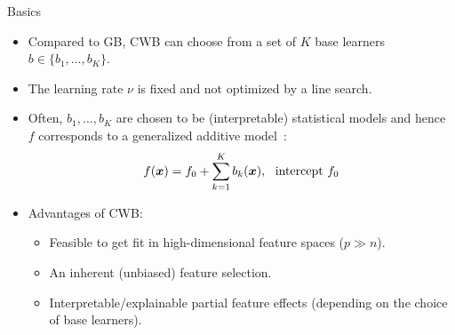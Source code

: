 \documentclass[t,10pt]{beamer}
\begin{document}
\begin{frame}{Basics}
  \begin{itemize}
    \item
      Compared to GB, CWB can choose from a set of $K$ base learners $b \in \{b_1, \dots, b_K\}$.

    \item
      The learning rate $\nu$ is fixed and not optimized by a line search.

    \item
      Often, $b_1, \dots, b_K$ are chosen to be (interpretable) statistical models and hence $f$ corresponds to a generalized additive model~\citep[GAM;][]{hastie2017generalized}: \[f(\xv) = f_0 + \sum_{k=1}^K b_k(\xv), \ \ \text{intercept}\ f_0\]

    \item
      Advantages of CWB:
      \begin{itemize}
        \item
          Feasible to get fit in high-dimensional feature spaces ($p \gg n$).

        \item
          An inherent (unbiased) feature selection.

        \item
          Interpretable/explainable partial feature effects (depending on the choice of base learners).
      \end{itemize}
  \end{itemize}
\end{frame}
\end{document}
